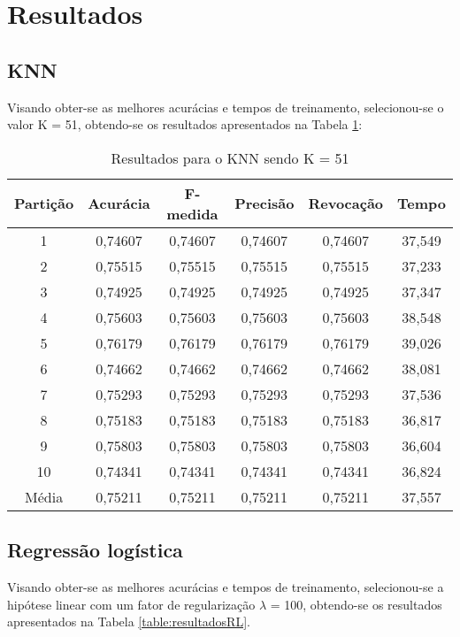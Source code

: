 \section{Resultados}

\subsection{KNN}

Visando obter-se as melhores acurácias e tempos de treinamento, selecionou-se o valor K = 51, obtendo-se os resultados apresentados na Tabela \ref{table:resultadosKNN}:

\begin{table}[h]
\centering
\caption{Resultados para o KNN sendo K = 51}
\vspace{0.2cm}
\begin{tabular}{c|c|c|c|c|c}
Partição & Acurácia & F-medida & Precisão & Revocação & Tempo \\
\hline
1  & 0,74607 & 0,74607 & 0,74607 & 0,74607 & 37,549 \\
2  & 0,75515 & 0,75515 & 0,75515 & 0,75515 & 37,233 \\
3  & 0,74925 & 0,74925 & 0,74925 & 0,74925 & 37,347 \\
4  & 0,75603 & 0,75603 & 0,75603 & 0,75603 & 38,548 \\
5  & 0,76179 & 0,76179 & 0,76179 & 0,76179 & 39,026 \\
6  & 0,74662 & 0,74662 & 0,74662 & 0,74662 & 38,081 \\
7  & 0,75293 & 0,75293 & 0,75293 & 0,75293 & 37,536 \\
8  & 0,75183 & 0,75183 & 0,75183 & 0,75183 & 36,817 \\
9  & 0,75803 & 0,75803 & 0,75803 & 0,75803 & 36,604 \\
10 & 0,74341 & 0,74341 & 0,74341 & 0,74341 & 36,824 \\
\hline
Média & 0,75211 & 0,75211 & 0,75211 & 0,75211 & 37,557

\end{tabular} 
\label{table:resultadosKNN}
\end{table}

\subsection{Regressão logística}

Visando obter-se as melhores acurácias e tempos de treinamento, selecionou-se a hipótese linear com um fator de regularização \(\lambda\) = 100, obtendo-se os resultados apresentados na Tabela \ref{table:resultadosRL}.

